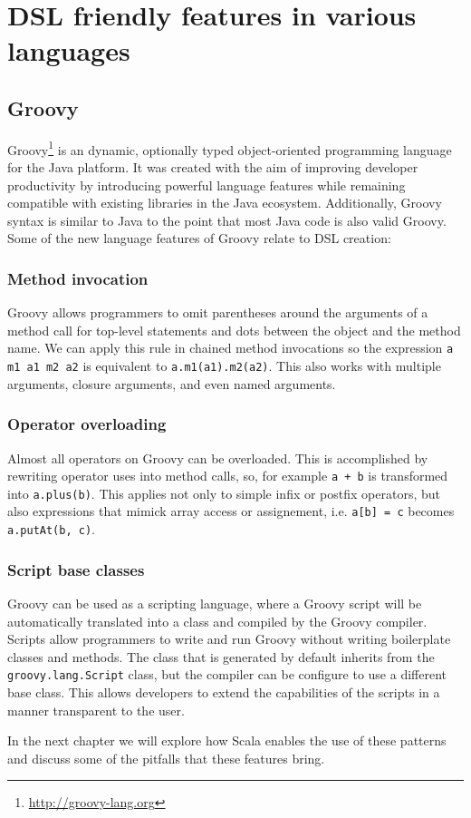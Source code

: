 \section{DSL friendly features in various languages}

\subsection{Groovy}

Groovy\footnote{\url{http://groovy-lang.org}} is an dynamic, optionally typed object-oriented programming language for the Java platform.
It was created with the aim of improving developer productivity by introducing powerful language features while remaining compatible with existing libraries in the Java ecosystem.
Additionally, Groovy syntax is similar to Java to the point that most Java code is also valid Groovy.
Some of the new language features of Groovy relate to DSL creation:

\subsubsection{Method invocation}

Groovy allows programmers to omit parentheses around the arguments of a method call for top-level statements and dots between the object and the method name.
We can apply this rule in chained method invocations so the expression \texttt{a m1 a1 m2 a2} is equivalent to \texttt{a.m1(a1).m2(a2)}.
This also works with multiple arguments, closure arguments, and even named arguments.

\subsubsection{Operator overloading}

Almost all operators on Groovy can be overloaded.
This is accomplished by rewriting operator uses into method calls, so, for example \texttt{a + b} is transformed into \texttt{a.plus(b)}.
This applies not only to simple infix or postfix operators, but also expressions that mimick array access or assignement, i.e. \texttt{a[b] = c} becomes \texttt{a.putAt(b, c)}.

\subsubsection{Script base classes}

Groovy can be used as a scripting language, where a Groovy script will be automatically translated into a class and compiled by the Groovy compiler.
Scripts allow programmers to write and run Groovy without writing boilerplate classes and methods.
The class that is generated by default inherits from the \texttt{groovy.lang.Script} class, but the compiler can be configure to use a different base class.
This allows developers to extend the capabilities of the scripts in a manner transparent to the user.

In the next chapter we will explore how Scala enables the use of these patterns and discuss some of the pitfalls that these features bring.
